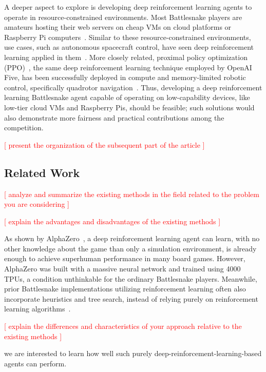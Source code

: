 \documentclass[conference]{IEEEtran}
\newcommand{\todo}[1]{\textcolor{red}{[ #1 ]}}
\begin{document}
A deeper aspect to explore is developing deep reinforcement learning agents to
operate in resource-constrained environments.
Most Battlesnake players are amateurs hosting their web servers on cheap VMs on
cloud platforms or Raspberry Pi computers~\cite{standard_leaderboard}.
Similar to these resource-constrained environments, use cases,
such as autonomous spacecraft control,
have seen deep reinforcement learning applied in
them~\cite{harris2022generation}. More closely related,
proximal policy optimization (PPO)~\cite{schulman2017proximal},
the same deep reinforcement learning technique employed by OpenAI Five,
has been successfully deployed in compute and memory-limited robotic control,
specifically quadrotor navigation~\cite{huang2023collision,hegde2023hyperppo}.
Thus,
developing a deep reinforcement learning Battlesnake agent capable of operating
on low-capability devices, like low-tier cloud VMs and Raspberry Pis,
should be feasible;
such solutions would also demonstrate more fairness and practical contributions
among the competition.

\todo{present the organization of the subsequent part of the article}

\subsection{Related Work}

\todo{analyze and summarize the existing methods in the field related to the
    problem you are considering
}

\todo{explain the advantages and disadvantages of the existing methods}

As shown by AlphaZero~\cite{silver2017mastering},
a deep reinforcement learning agent can learn,
with no other knowledge about the game than only a simulation environment,
is already enough to achieve superhuman performance in many board games.
However,
AlphaZero was built with a massive neural network and trained using 4000 TPUs,
a condition unthinkable for the ordinary Battlesnake players. Meanwhile,
prior Battlesnake implementations utilizing reinforcement learning often also
incorporate heuristics and tree search,
instead of relying purely on reinforcement learning
algorithms~\cite{chung2020battlesnake,binnersley2020battlesnake}.

\todo{explain the differences and characteristics of your approach relative to
    the existing methods
}

we are interested to learn how well such purely
deep-reinforcement-learning-based agents can perform.
\end{document}
